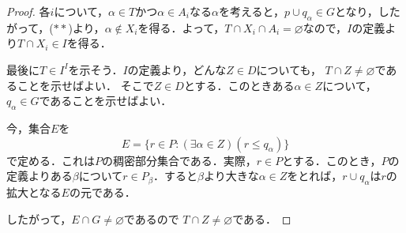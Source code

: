 \documentclass[uplatex]{jsarticle}
\renewcommand\emptyset{\varnothing}
\theoremstyle{definition}
\begin{document}
\begin{proof}
		各$i$について，$\alpha \in T$かつ$\alpha \in A_i$なる$\alpha$を考えると，$p \cup q_\alpha \in G$となり，したがって，($**$)より，$\alpha \not \in X_i$を得る．よって，$T \cap X_i \cap A_i = \emptyset$なので，$I$の定義より$T \cap X_i \in I$を得る．
		
		最後に$T \in I^I$を示そう．$I$の定義より，どんな$Z \in D$についても， $T \cap Z \ne \emptyset$であることを示せばよい．
		そこで$Z \in D$とする．このときある$\alpha \in Z$について，$q_\alpha \in G$であることを示せばよい．
	
		今，集合$E$を
		\[
		E = \{ r \in P : (\exists \alpha \in Z)(r \le q_\alpha) \}
		\]
		で定める．これは$P$の稠密部分集合である．実際，$r \in P$とする．このとき，$P$の定義よりある$\beta$について$r \in P_\beta$．すると$\beta$より大きな$\alpha \in Z$をとれば，$r \cup q_\alpha$は$r$の拡大となる$E$の元である．
		
		したがって，$E \cap G \ne \emptyset$であるので $T \cap Z \ne \emptyset$である．
		\end{proof}
	
	\nocite{*}
	\printbibliography[title={参考文献}]

	
\end{document}
